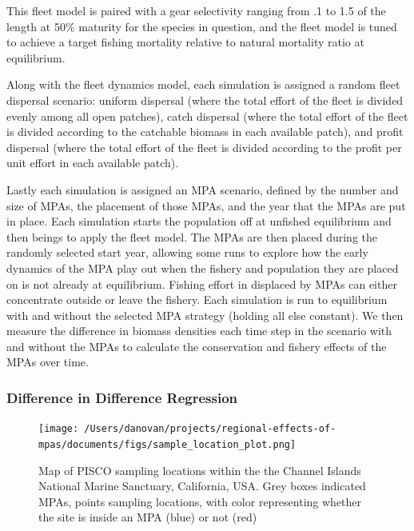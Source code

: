 \documentclass[9pt,twocolumn,twoside,lineno]{pnas-new}
\begin{document}
This fleet model is paired with a gear selectivity ranging from .1 to
1.5 of the length at 50\% maturity for the species in question, and the
fleet model is tuned to achieve a target fishing mortality relative to
natural mortality ratio at equilibrium.

Along with the fleet dynamics model, each simulation is assigned a
random fleet dispersal scenario: uniform dispersal (where the total
effort of the fleet is divided evenly among all open patches), catch
dispersal (where the total effort of the fleet is divided according to
the catchable biomass in each available patch), and profit dispersal
(where the total effort of the fleet is divided according to the profit
per unit effort in each available patch).

Lastly each simulation is assigned an MPA scenario, defined by the
number and size of MPAs, the placement of those MPAs, and the year that
the MPAs are put in place. Each simulation starts the population off at
unfished equilibrium and then beings to apply the fleet model. The MPAs
are then placed during the randomly selected start year, allowing some
runs to explore how the early dynamics of the MPA play out when the
fishery and population they are placed on is not already at equilibrium.
Fishing effort in displaced by MPAs can either concentrate outside or
leave the fishery. Each simulation is run to equilibrium with and
without the selected MPA strategy (holding all else constant). We then
measure the difference in biomass densities each time step in the
scenario with and without the MPAs to calculate the conservation and
fishery effects of the MPAs over time.

\hypertarget{difference-in-difference-regression}{%
\subsubsection{Difference in Difference
Regression}\label{difference-in-difference-regression}}

\begin{figure}%
  \centering
  \texttt{[image: /Users/danovan/projects/regional-effects-of-mpas/documents/figs/sample\_location\_plot.png]}
  \caption{Map of PISCO sampling locations within the the Channel Islands National Marine Sanctuary, California, USA. Grey boxes indicated MPAs, points sampling locations, with color representing whether the site is inside an MPA (blue) or not (red)}
  \label{channel-islands}
\end{figure}
\end{document}
